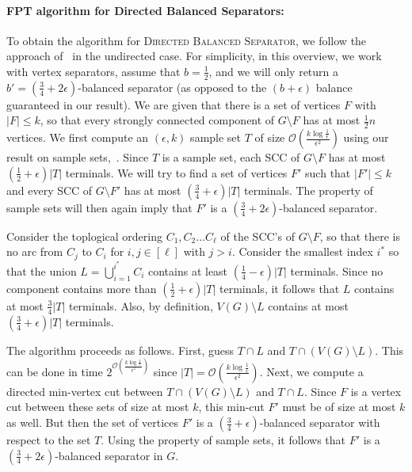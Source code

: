 \documentclass[11pt]{article}
\newcommand{\OO}{\mathcal{O}}
\newcommand{\DB}{{\textsc{Directed Balanced Separator}}}
\begin{document}
\paragraph{FPT algorithm for Directed Balanced Separators:}
To obtain the algorithm for \DB{}, we follow the approach of~\cite{fm06} in the undirected case. For simplicity, in this overview, we work with vertex separators, assume that $b = \frac{1}{2}$, and we will only return a $b' = (\frac{3}{4} + 2\epsilon)$-balanced separator (as opposed to the $(b + \epsilon)$ balance guaranteed in our result). We are given that there is a set of vertices $F$ with $|F| \leq k$, so that every strongly connected component of $G \setminus F$ has at most $\frac{1}{2}n$ vertices. We first compute an $(\epsilon, k)$ sample set $T$ of size $\OO\left ( \frac{k \log \frac{1}{\epsilon}}{\epsilon^2}\right)$ using our result on sample sets,~. Since $T$ is a sample set, each SCC of $G \setminus F$ has at most $(\frac{1}{2} + \epsilon)|T|$ terminals. We will try to find a set of vertices $F'$ such that $|F'| \leq k$ and every SCC of $G \setminus F'$ has at most $(\frac{3}{4} + \epsilon)|T|$ terminals. The property of sample sets will then again imply that $F'$ is a $(\frac{3}{4} + 2\epsilon)$-balanced separator.

Consider the toplogical ordering $C_1, C_2 \ldots C_{\ell}$ of the SCC's of $G \setminus F$, so that there is no arc from $C_j$ to $C_i$ for $i,j \in [\ell]$ with $j > i$. Consider the smallest index $i^*$ so that the union $L = \bigcup_{i = 1}^{i^*} C_i$ contains at least $(\frac{1}{4} - \epsilon)|T|$ terminals. Since no component contains more than $(\frac{1}{2} + \epsilon)|T|$ terminals, it follows that $L$ contains at most $\frac{3}{4}|T|$ terminals. Also, by definition, $V(G) \setminus L$ contains at most $(\frac{3}{4} + \epsilon)|T|$ terminals.

The algorithm proceeds as follows. First, guess $T \cap L$ and $T \cap (V(G) \setminus L)$. This can be done in time $2^{\OO\left(\frac{k \log \frac{1}{\epsilon}}{\epsilon^2}\right)}$ since $|T| = \OO\left(\frac{k\log \frac{1}{\epsilon}}{\epsilon^2}\right)$. Next, we compute a directed min-vertex cut between $T \cap (V(G) \setminus L)$ and $T \cap L$. Since $F$ is a vertex cut between these sets of size at most $k$, this min-cut $F'$ must be of size at most $k$ as well. But then the set of vertices $F'$ is a $(\frac{3}{4} + \epsilon)$-balanced separator with respect to the set $T$. Using the property of sample sets, it follows that $F'$ is a $(\frac{3}{4} + 2\epsilon)$-balanced separator in $G$.
 
\end{document}
